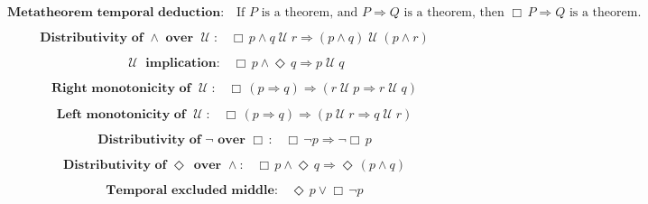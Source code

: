\documentclass[12pt, fleqn, leqno]{article}
\newcommand{\impl}{\ensuremath{\Rightarrow}}        %
\newcommand{\Until}{\;\mathcal{U}\;}
\newcommand{\Event}{\Diamond\,}
\newcommand{\Always}{\Box\,}
\newcommand{\spacer}{\vspace{-30pt}}
\begin{document}
\begin{equation}\label{E:metaDeduction}
\textbf{Metatheorem temporal deduction:}\quad \text{If } P \text{ is a theorem,}
\text{ and } P\impl Q \text{ is a theorem, then } \Always P\impl Q \text{ is a theorem.}
\end{equation}

\spacer

\begin{equation}\label{E:andUntilDist}
\textbf{Distributivity of $\land$ over $\Until$:}\quad \Always p \land q \Until r \impl (p \land q) \Until (p \land r)
\end{equation}

\spacer

\begin{equation}\label{E:axiomUntilImpl}
\textbf{$\Until$ implication:}\quad \Always p \land \Event q \impl p \Until q
\end{equation}

\spacer

\begin{equation}\label{E:rightMonoUntil}
\textbf{Right monotonicity of $\Until$:}\quad \Always (p \impl q) \impl (r \Until p \impl r \Until q)
\end{equation}

\spacer

\begin{equation}\label{E:leftMonoUntil}
\textbf{Left monotonicity of $\Until$:}\quad \Always (p \impl q) \impl (p \Until r \impl q \Until r)
\end{equation}
\spacer

\begin{equation}\label{E:exAlwaysNot}
\textbf{Distributivity of $\neg$ over $\Always$:}\quad \Always\neg p \impl \neg\Always p
\end{equation}

\spacer

\begin{equation}\label{E:alwaysAndEvent}
\textbf{Distributivity of $\Event$ over $\land$:}\quad \Always p \land \Event q \impl \Event (p \land q)
\end{equation}

\spacer

\begin{equation}\label{E:excludedMid}
\textbf{Temporal excluded middle:}\quad \Event p \lor \Always\neg p
\end{equation}
\end{document}
